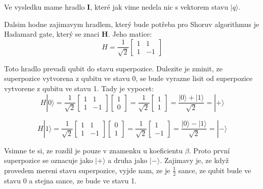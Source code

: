 \documentclass[11pt]{article}
\begin{document}
\par Ve vysledku mame hradlo \textbf{I}, které jak vime nedela nic s vektorem stavu $|q\rangle$.
\par Dalsim hodne zajimavym hradlem, který bude potřeba pro Shoruv algorithmus je Hadamard gate, který se znaci \textbf{H}. Jeho matice:
$$H = \frac{1}{\sqrt{2}}\begin{bmatrix}
        1 & 1  \\
        1 & -1
    \end{bmatrix}$$
\par Toto hradlo prevadi qubit do stavu superpozice. Dulezite je zminit, ze superpozice vytvorena z qubitu ve stavu 0, se bude vyrazne lisit od superpozice vytvorene z qubitu ve stavu 1.
Tady je vypocet:
$$H|0\rangle = \frac{1}{\sqrt{2}}\begin{bmatrix}
        1 & 1  \\
        1 & -1
    \end{bmatrix}\begin{bmatrix}
        1 \\
        0
    \end{bmatrix} = \frac{1}{\sqrt{2}}\begin{bmatrix}
        1 \\
        1
    \end{bmatrix} = \frac{|0\rangle + |1\rangle}{\sqrt{2}} = |+\rangle$$

$$H|1\rangle = \frac{1}{\sqrt{2}}\begin{bmatrix}
        1 & 1  \\
        1 & -1
    \end{bmatrix}\begin{bmatrix}
        0 \\
        1
    \end{bmatrix} = \frac{1}{\sqrt{2}}\begin{bmatrix}
        1 \\
        -1
    \end{bmatrix} = \frac{|0\rangle - |1\rangle}{\sqrt{2}} = |-\rangle$$

\par Vsimne te si, ze rozdil je pouze v znamenku u koeficientu $\beta$. Proto první superpozice se oznacuje jako $|+\rangle$ a druha jako $|-\rangle$.
Zajimavy je, ze když provedem mereni stavu superpozice, vyjde nam, ze je $\frac{1}{2}$ sance, ze qubit bude ve stavu 0 a stejna sance, ze bude ve stavu 1.
\end{document}

